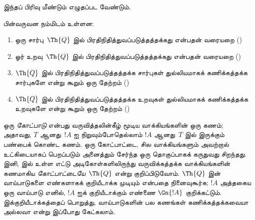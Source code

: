\documentclass[../../../include/open-logic-section]{subfiles}
\begin{document}



\begin{editorial}
இந்தப் பிரிவு மீண்டும் எழுதப்பட வேண்டும்.
\end{editorial}

பின்வருவன நம்மிடம் உள்ளன:
\begin{enumerate}
\item ஒரு சார்பு~$\Th{Q}$ இல் பிரதிநிதித்துவப்படுத்தத்தக்கது என்பதன்
  வரையறை ()
\item ஓர் உறவு~$\Th{Q}$ இல் பிரதிநிதித்துவப்படுத்தத்தக்கது என்பதன்
  வரையறை ()
\item $\Th{Q}$ இல் பிரதிநிதித்துவப்படுத்தத்தக்க சார்புகள் துல்லியமாகக்
  கணிக்கத்தக்க சார்புகளே என்று கூறும் ஒரு தேற்றம்
  ()
\item $\Th{Q}$ இல் பிரதிநிதித்துவப்படுத்தத்தக்க உறவுகள் துல்லியமாகக்
  கணிக்கத்தக்க உறவுகளே என்று கூறும் ஒரு தேற்றம்
  ()
\end{enumerate}

ஒரு {\em கோட்பாடு} என்பது வருவித்தலின்கீழ் மூடிய வாக்கியங்களின் ஒரு
கணம்; அதாவது, $T$ ஆனது~$!A$ ஐ நிறுவும்போதெல்லாம் $!A$ ஆனது~$T$ இல்
இருக்கும் பண்பைக் கொண்ட கணம். ஒரு கோட்பாட்டை, சில வாக்கியங்களும்
அவற்றால் உட்கிடையாகப் பெறப்படும் அனைத்தும் சேர்ந்த ஒரு தொகுப்பாகக்
கருதுவது சிறந்தது. இனி,  இல் உள்ள எட்டு
அடிகோள்களிலிருந்து வருவிக்கத்தக்க வாக்கியங்களின் கணமாகிய
{\em கோட்பாட்டையே}~$\Th{Q}$ என்று குறிப்பிடுவோம். $\Th{Q}$ இன்
வாய்பாடுகளை எண்களாகக் குறியீடாக்க முடியும் என்பதை நினைவுகூர்க;
$!A$ அத்தகைய ஒரு வாய்பாடு எனில், $!A$ ஐக் குறியீடாக்கும் எண்ணை
$\Gn{!A}$ குறிக்கட்டும். இக்குறியீடாக்கத்தைப் பொறுத்து, வாய்பாடுகளின்
பல கணங்கள் கணிக்கத்தக்கவையா அல்லவா என்று இப்போது கேட்கலாம்.
\end{document}
